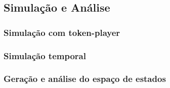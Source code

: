 \subsection{Simulação e Análise}

\subsubsection{Simulação com token-player}

\subsubsection{Simulação temporal}

\subsubsection{Geração e análise do espaço de estados}
